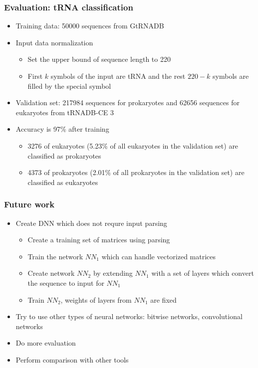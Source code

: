 \documentclass[xcolor=table]{beamer}
\begin{document}
\begin{frame} \frametitle{Evaluation: tRNA classification}
\begin{itemize}
 \item Training data: 50000 sequences from GtRNADB
 \item Input data normalization
 \begin {itemize}
    \item Set the upper bound of sequence length to 220
    \item First $k$ symbols of the input are tRNA and the rest $220 - k$ symbols are filled by the special symbol
\end{itemize}

\item Validation set:  217984 sequences for prokaryotes and 62656 sequences for eukaryotes from tRNADB-CE 3
\item Accuracy is 97\% after training
\begin{itemize}
  \item 3276 of eukaryotes (5.23\% of all eukaryotes in the validation set) are classified as prokaryotes \item 4373 of prokaryotes (2.01\% of all prokaryotes in the validation set) are classified as eukaryotes
\end{itemize}

\end{itemize}

\end{frame}


\begin{frame} \frametitle{Future work}

\begin{itemize}
 \item Create DNN which does not requre input parsing
 \begin{itemize}
   \item Create a training set of matrices using parsing
   \item Train the network $NN_1$ which can handle vectorized matrices
   \item Create network $NN_2$ by extending $NN_1$ with a set of layers which convert the sequence to input for $NN_1$
   \item Train $NN_2$, weights of layers from $NN_1$ are fixed
 \end{itemize}
 \item Try to use other types of neural networks: bitwise networks, convolutional networks
 \item Do more evaluation
 \item Perform comparison with other tools
\end{itemize}

\end{frame}
\end{document}
